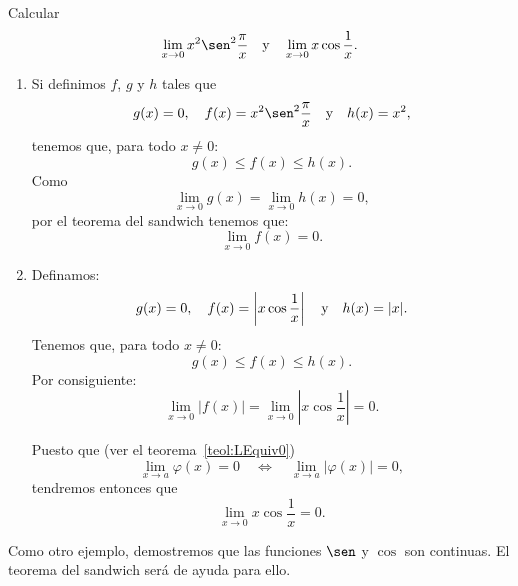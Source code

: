 \begin{exemplo}[Solución]{%
Calcular
\[
\lim_{x\to 0}x^2\sen^2 \frac{\pi}{x} \yjc  \lim_{x\to 0}x\cos \frac{1}{x}.
\]
}
\begin{enumerate}[leftmargin=*]
\item Si definimos $f$, $g$ y $h$ tales que
\[
g(x)=0, \quad f(x)= x^2\sen^2 \frac{\pi}{x} \yjc h(x)=x^2,
\]
tenemos que, para todo $x\neq 0$:
\[
g(x)\leq f(x)\leq h(x).
\]
Como
\[
\lim_{x\to 0}g(x)= \lim_{x\to 0}h(x)=0,
\]
por el teorema del sandwich tenemos que:
\[
\lim_{x\to 0}f(x)=0.
\]

\item Definamos:
\[
g(x)=0, \quad f(x)=\left| x\cos \frac{1}{x}  \right| \quad\text{y}\quad h(x)=|x|.
\]
Tenemos que, para todo $x\neq 0$:
\[
g(x)\leq f(x)\leq h(x).
\]
Por consiguiente:
\[
\lim_{x\to 0}|f(x)|= \lim_{x\to 0}\left|x\cos \frac{1}{x}\right|=0.
\]

Puesto que (ver el teorema~\ref{teol:LEquiv0})
\[
\lim_{x\to a} \varphi (x)=0\quad \Leftrightarrow \quad \lim_{x\to a} |\varphi (x)|=0,
\]
tendremos entonces que
\[
\lim_{x\to 0}x\cos \frac{1}{x} = 0.
\]
\end{enumerate}
\end{exemplo}

Como otro ejemplo, demostremos que las funciones $\sen$ y $\cos$ son continuas. El teorema del
sandwich será de ayuda para ello.

